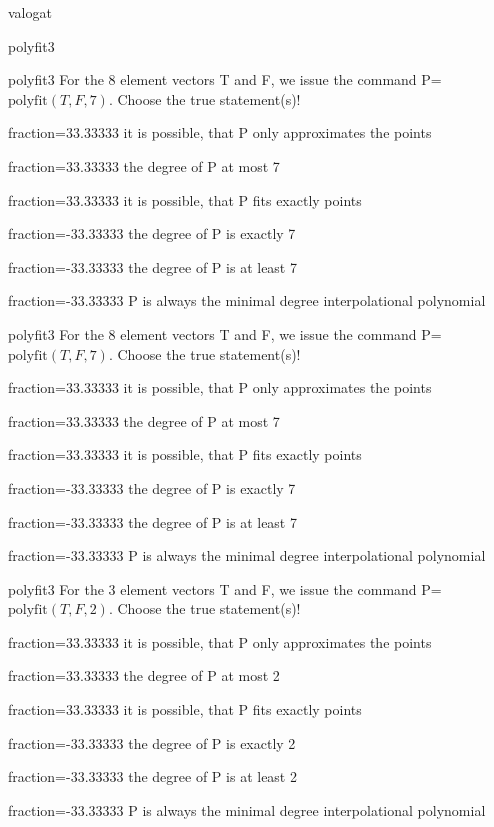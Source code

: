 \documentclass[12pt]{article}
\begin{document}
\begin{quiz}{valogat}
\begin{multi}[single=false]{polyfit3}
\end{multi}
\begin{multi}[single=false]{polyfit3}
For the $8$ element vectors T and F, we issue the command P=$\mathrm{polyfit}(T,F,7)$.
Choose the true statement(s)!
\item[fraction=33.33333] it is possible, that P only approximates the points
\item[fraction=33.33333] the degree of P at most 7
\item[fraction=33.33333] it is possible, that P fits exactly points
\item[fraction=-33.33333]  the degree of P is exactly 7
\item[fraction=-33.33333]  the degree of P is at least 7
\item[fraction=-33.33333]  P is always the minimal degree interpolational polynomial
\end{multi}
\begin{multi}[single=false]{polyfit3}
For the $8$ element vectors T and F, we issue the command P=$\mathrm{polyfit}(T,F,7)$.
Choose the true statement(s)!
\item[fraction=33.33333] it is possible, that P only approximates the points
\item[fraction=33.33333] the degree of P at most 7
\item[fraction=33.33333] it is possible, that P fits exactly points
\item[fraction=-33.33333]  the degree of P is exactly 7
\item[fraction=-33.33333]  the degree of P is at least 7
\item[fraction=-33.33333]  P is always the minimal degree interpolational polynomial
\end{multi}
\begin{multi}[single=false]{polyfit3}
For the $3$ element vectors T and F, we issue the command P=$\mathrm{polyfit}(T,F,2)$.
Choose the true statement(s)!
\item[fraction=33.33333] it is possible, that P only approximates the points
\item[fraction=33.33333] the degree of P at most 2
\item[fraction=33.33333] it is possible, that P fits exactly points
\item[fraction=-33.33333]  the degree of P is exactly 2
\item[fraction=-33.33333]  the degree of P is at least 2
\item[fraction=-33.33333]  P is always the minimal degree interpolational polynomial

\end{multi}
\end{quiz}
\end{document}
